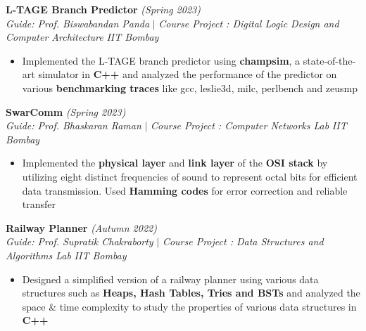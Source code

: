 \documentclass[a4paper,10pt]{article}
\begin{document}
\vspace{\baselineskip}
\vspace{-15pt}
\noindent\textbf{\large L-TAGE Branch Predictor} \hfill{\sl \small (Spring 2023)}\\
{\it Guide: Prof. Biswabandan Panda} $|$ {\it Course Project : Digital Logic Design and Computer Architecture } \hfill{\it IIT Bombay}
\vspace{-2pt}
\begin{itemize}[itemsep = -0.65 mm, leftmargin=*]
    \item Implemented the L-TAGE branch predictor using \textbf{champsim}, a state-of-the-art simulator in \textbf{C++} and analyzed the performance of the predictor on various \textbf{benchmarking traces} like gcc, leslie3d, milc, perlbench and zeusmp
\end{itemize}
\vspace{\baselineskip}
\vspace{-15pt}
\noindent\textbf{\large SwarComm} \hfill{\sl \small (Spring 2023)}\\
{\it Guide: Prof. Bhaskaran Raman} $|$ {\it Course Project : Computer Networks Lab} \hfill{\it IIT Bombay}
\vspace{-2pt}
\begin{itemize}[itemsep = -0.65 mm, leftmargin=*]
    \item Implemented the \textbf{physical layer} and \textbf{link layer} of the \textbf{OSI stack} by utilizing eight distinct frequencies of sound to represent octal bits for efficient data transmission. Used \textbf{Hamming codes} for error correction and reliable transfer
\end{itemize}
\vspace{\baselineskip}
\vspace{-10pt}
\noindent\textbf{\large Railway Planner} \hfill{\sl \small (Autumn 2022)}\\
{\it Guide: Prof. Supratik Chakraborty} $|$ {\it Course Project : Data Structures and Algorithms Lab } \hfill{\it IIT Bombay}
\vspace{-3pt}
\begin{itemize}[itemsep = -0.65 mm, leftmargin=*]
    \item Designed a simplified version of a railway planner using various data structures such as \textbf{Heaps, Hash Tables, Tries and BSTs} and analyzed the space \& time complexity to study the properties of various data structures in \textbf{C++}
\end{itemize}
\end{document}
